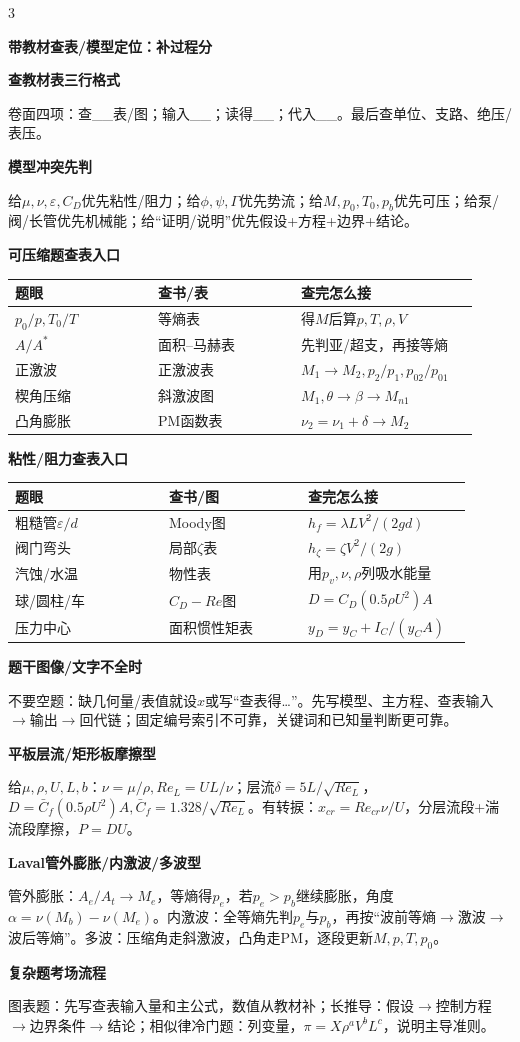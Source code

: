 \documentclass[a4paper]{article}
\newcommand{\qt}[1]{\vspace{0.25pt}\colorbox{Q}{\parbox{\dimexpr\linewidth-2\fboxsep}{\color{white}\bfseries #1}}\par}
\newcommand{\sect}[1]{\qt{#1}}
\begin{document}
\begin{multicols}{3}
{\sect{带教材查表/模型定位：补过程分}
\sect{查教材表三行格式}
卷面四项：查\_\_表/图；输入\_\_；读得\_\_；代入\_\_。最后查单位、支路、绝压/表压。
\sect{模型冲突先判}
给$\mu,\nu,\varepsilon,C_D$优先粘性/阻力；给$\phi,\psi,\Gamma$优先势流；给$M,p_0,T_0,p_b$优先可压；给泵/阀/长管优先机械能；给“证明/说明”优先假设+方程+边界+结论。
\sect{可压缩题查表入口}
\begin{tabular}{|p{0.29\linewidth}|p{0.29\linewidth}|p{0.34\linewidth}|}\hline
题眼 & 查书/表 & 查完怎么接\\\hline
$p_0/p,T_0/T$ & 等熵表 & 得$M$后算$p,T,\rho,V$\\\hline
$A/A^*$ & 面积--马赫表 & 先判亚/超支，再接等熵\\\hline
正激波 & 正激波表 & $M_1\to M_2,p_2/p_1,p_{02}/p_{01}$\\\hline
楔角压缩 & 斜激波图 & $M_1,\theta\to\beta\to M_{n1}$\\\hline
凸角膨胀 & PM函数表 & $\nu_2=\nu_1+\delta\to M_2$\\\hline
\end{tabular}
\sect{粘性/阻力查表入口}
\begin{tabular}{|p{0.31\linewidth}|p{0.28\linewidth}|p{0.33\linewidth}|}\hline
题眼 & 查书/图 & 查完怎么接\\\hline
粗糙管$\varepsilon/d$ & Moody图 & $h_f=\lambda L V^2/(2gd)$\\\hline
阀门弯头 & 局部$\zeta$表 & $h_\zeta=\zeta V^2/(2g)$\\\hline
汽蚀/水温 & 物性表 & 用$p_v,\nu,\rho$列吸水能量\\\hline
球/圆柱/车 & $C_D-Re$图 & $D=C_D(0.5\rho U^2)A$\\\hline
压力中心 & 面积惯性矩表 & $y_D=y_C+I_C/(y_CA)$\\\hline
\end{tabular}
\sect{题干图像/文字不全时}
不要空题：缺几何量/表值就设$x$或写“查表得…”。先写模型、主方程、查表输入$\to$输出$\to$回代链；固定编号索引不可靠，关键词和已知量判断更可靠。
\sect{平板层流/矩形板摩擦型}
给$\mu,\rho,U,L,b$：$\nu=\mu/\rho,Re_L=UL/\nu$；层流$\delta=5L/\sqrt{Re_L}$，$D=\bar C_f(0.5\rho U^2)A,\bar C_f=1.328/\sqrt{Re_L}$。有转捩：$x_{cr}=Re_{cr}\nu/U$，分层流段+湍流段摩擦，$P=DU$。
\sect{Laval管外膨胀/内激波/多波型}
管外膨胀：$A_e/A_t\to M_e$，等熵得$p_e$，若$p_e>p_b$继续膨胀，角度$\alpha=\nu(M_b)-\nu(M_e)$。内激波：全等熵先判$p_e$与$p_b$，再按“波前等熵$\to$激波$\to$波后等熵”。多波：压缩角走斜激波，凸角走PM，逐段更新$M,p,T,p_0$。
\sect{复杂题考场流程}
图表题：先写查表输入量和主公式，数值从教材补；长推导：假设$\to$控制方程$\to$边界条件$\to$结论；相似律冷门题：列变量，$\pi=X\rho^aV^bL^c$，说明主导准则。

}
\end{multicols}
\end{document}
